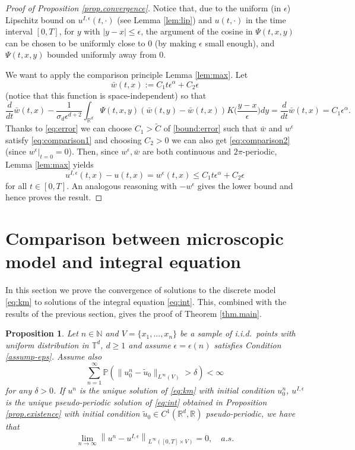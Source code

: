 \documentclass[a4paper,11pt]{amsart}
\newtheorem{proposition}[theorem]{Proposition}
\newcommand{\red}[1]{{#1}}
\newcommand{\N}{\mathbb{N}}
\renewcommand{\P}{\mathbb{P}}
\newcommand{\R}{\mathbb{R}}
\newcommand{\T}{\mathbb{T}}
\newcommand{\ep}{\epsilon}
\numberwithin{equation}{section}
\numberwithin{theorem}{section}
\theoremstyle{definition}
\begin{document}
\begin{proof}[Proof of Proposition \ref{prop.convergence}]
Notice that, due to the uniform (in $\ep$) Lipschitz bound on $u^{I,\ep}(t,\cdot)$ (see Lemma \ref{lem:lip}) and $u(t,\cdot)$ in the time interval $[0,T]$, for $y$ with $|y-x|\le \ep$, the argument of the cosine in $\Psi(t, x,y)$ can be chosen to be uniformly close to $0$ (by making $\ep$ small enough), and $\Psi(t,x,y)$ bounded uniformly away from $0$.

We want to apply the comparison principle Lemma \ref{lem:max}. Let
\[
\bar{w}(t,x):=C_1t\ep^\alpha+C_2\ep
\]
(notice that this function is space-independent) so that 
\[
\frac{d}{dt}\bar w(t,x) - \frac{1}{\sigma_d\ep^{d+2}}\int_{\R^d}\Psi(t,x,y)\left(\bar w(t,y)-\bar w(t,x)\right) K\Big(\frac{y-x}{\ep}\Big)dy=\frac{d}{dt}\bar w(t,x) =C_1\ep^\alpha .
\]
Thanks to \eqref{eq:error} we can choose $C_1>\tilde C$ of \eqref{bound:error} such that $\bar w$ and $w^\ep$ satisfy \eqref{eq:comparison1} and choosing $C_2>0$ we can also get \eqref{eq:comparison2} (since $w^\ep|_{t=0}=0$). Then, \red{since $w^\ep, \bar w$ are both continuous and $2\pi$-periodic},  Lemma \ref{lem:max} yields
\[
u^{I,\ep}(t,x)-u(t,x)=w^\ep(t,x)\leq C_1t\ep^\alpha+C_2\ep
\]
for all $t\in[0,T]$. An analogous reasoning with $-w^\ep$ gives the lower bound and hence proves the result.
\end{proof}

\section{Comparison between microscopic model and integral equation}\label{sec.microtoint}

In this section we prove the convergence of solutions to the discrete model \eqref{eq:km} to solutions of the integral equation \eqref{eq:int}. This, combined with the results of the previous section, gives the proof of Theorem \ref{thm.main}. 

\begin{proposition}\label{ppn:kur-to-int}
Let $n\in\N$ and $V=\{x_1,...,x_n\}$ be a sample of i.i.d.~points with uniform distribution in $\T^d$, $d\ge 1$ and assume $\ep=\ep(n)$ satisfies Condition \ref{assump-eps}. Assume also 
\[
\sum_{n=1}^\infty \P\left(\|u^n_0 - \tilde u_0\|_{L^\infty(V)} > \delta \right)<\infty
\]
for any $\delta>0$. If $u^{n}$ is the unique solution of \eqref{eq:km} with initial condition $u^n_0$, $u^{I,\ep}$ is the unique \red{pseudo-periodic solution of \eqref{eq:int} obtained in Proposition \ref{prop.existence} with initial condition $\tilde u_0\in C^1(\R^d, \R)$ pseudo-periodic,} we have that
\[
\lim_{n\to\infty}\left\|u^{n}-u^{I,\ep}\right\|_{L^\infty([0,T]\times V)}=0, \quad a.s.
\]
\end{proposition} 
\end{document}
